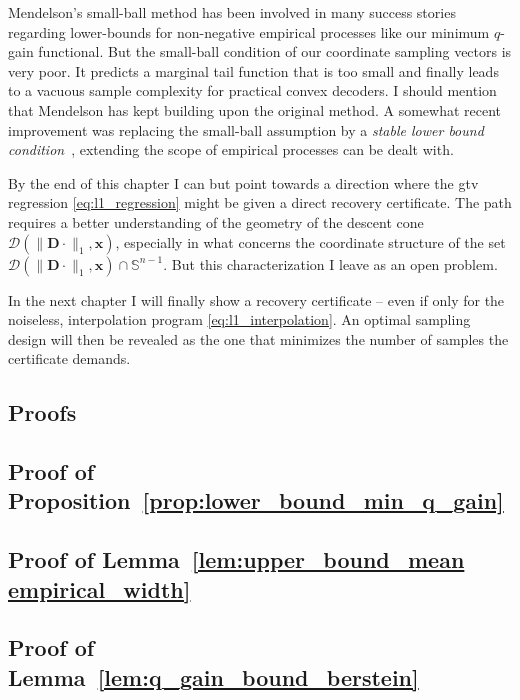 Mendelson's small-ball method has been involved in many success stories regarding lower-bounds for non-negative empirical processes like our minimum $q$-gain functional. But the small-ball condition of our coordinate sampling vectors is very poor. It predicts a marginal tail function that is too small and finally leads to a vacuous sample complexity for practical convex decoders. I should mention that Mendelson has kept building upon the original method. A somewhat recent improvement was replacing the small-ball assumption by a \emph{stable lower bound condition}~\cite{mendelson2017}, extending the scope of empirical processes can be dealt with.

By the end of this chapter I can but point towards a direction where the \acrshort{gtv} regression \eqref{eq:l1_regression} might be given a direct recovery certificate. The path requires a better understanding of the geometry of the descent cone $\mathcal{D}( \|\mathbf{D} \cdot \|_1, \mathbf{x})$, especially in what concerns the coordinate structure of the set $\mathcal{D}( \|\mathbf{D} \cdot \|_1, \mathbf{x}) \cap \mathbb{S}^{n-1}$. But this characterization I leave as an open problem.

In the next chapter I will finally show a recovery certificate -- even if only for the noiseless, interpolation program  \eqref{eq:l1_interpolation}. An optimal sampling design will then be revealed as the one that minimizes the number of samples the certificate demands.

\clearpage

\begin{subappendices}
    \section{Proofs}

    \subsection{Proof of Proposition~\ref{prop:lower_bound_min_q_gain}}
    \label{ap:proof_small_ball}
    

    \subsection{Proof of Lemma~\ref{lem:upper_bound_mean empirical_width}}
    \label{ap:proof_empirical_width_l1}
    

    \subsection{Proof of Lemma~\ref{lem:q_gain_bound_berstein}}
    \label{ap:proof_q_gain_bound_berstein}
    
\end{subappendices}